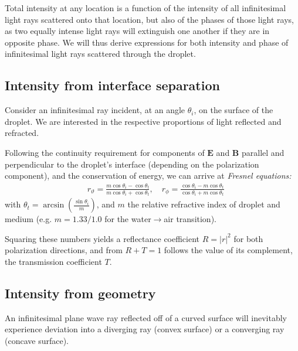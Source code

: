 \documentclass[11.5pt,oneside]{book}
\begin{document}
Total intensity at any location is a function of the intensity of all
infinitesimal light rays scattered onto that location, but also of the phases of
those light rays, as two equally intense light rays will extinguish one another
if they are in opposite phase. We will thus derive expressions for both
intensity and phase of infinitesimal light rays scattered through the droplet.

\subsection{Intensity from interface separation}
Consider an infinitesimal ray incident, at an angle $\theta_i$, on the surface
of the droplet. We are interested in the respective proportions of light
reflected and refracted.

Following the continuity requirement for components of $\mathbf{E}$ and
$\mathbf{B}$ parallel and perpendicular to the droplet's interface (depending on
the polarization component), and the conservation of energy, we can arrive at
\emph{Fresnel equations:}
\begin{align}
    \label{eq:fresnelequations}
    &r_\vartheta = \frac{m \cos \theta_i - \cos \theta_t}{m \cos \theta_i +
\cos \theta_t},\quad
r_\phi = \frac{\cos \theta_i - m \cos \theta_t}{\cos \theta_i +
m \cos \theta_t}
\end{align}
with $\theta_t = \arcsin\left(\frac{\sin \theta_i}{m}\right)$, and $m$ the
relative refractive index of droplet and medium (e.g. $m = 1.33/1.0$ for the
water$\rightarrow$air transition).

Squaring these numbers yields a reflectance coefficient $R = |r|^2$ for both
polarization directions, and from $R + T = 1$ follows the value of its 
complement, the transmission coefficient $T$.

\subsection{Intensity from geometry}
An infinitesimal plane wave ray reflected off of a curved surface will inevitably
experience deviation into a diverging ray (convex surface) or a converging ray
(concave surface).
\end{document}
